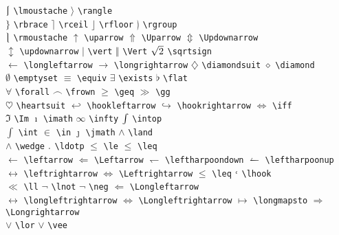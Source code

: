 \documentclass{asl}
\begin{document}
\begin{tabbing}
$\lmoustache$ \> \verb+\lmoustache+ \> $\rangle$ \> \verb+\rangle+ \\
$\rbrace$ \> \verb+\rbrace+ \> $\rceil$ \> \verb+\rceil+ \>
$\rfloor$ \> \verb+\rfloor+ \> $\rgroup$ \> \verb+\rgroup+ \\
$\rmoustache$ \> \verb+\rmoustache+ \> $\uparrow$ \> \verb+\uparrow+ \>
$\Uparrow$ \> \verb+\Uparrow+ \> $\Updownarrow$ \> \verb+\Updownarrow+ \\
$\updownarrow$ \> \verb+\updownarrow+ \> $\vert$ \> \verb+\vert+ \>
$\Vert$ \> \verb+\Vert+ \> $\sqrtsign{2}$ \> \verb+\sqrtsign+ \\
$\longleftarrow$ \> \verb+\longleftarrow+ \> $\longrightarrow$ \> \verb+\longrightarrow+ \>
$\diamondsuit$ \> \verb+\diamondsuit+
\> $\diamond$ \> \verb+\diamond+ \\
$\emptyset$ \> \verb+\emptyset+ \> $\equiv$ \> \verb+\equiv+ \>
$\exists$ \> \verb+\exists+ \> $\flat$ \> \verb+\flat+ \\
$\forall$ \> \verb+\forall+ \> $\frown$ \> \verb+\frown+ \>
$\geq$ \> \verb+\geq+  \> $\gg$ \> \verb+\gg+ \\
$\heartsuit$ \> \verb+\heartsuit+ \> $\hookleftarrow$ \> \verb+\hookleftarrow+ \>
$\hookrightarrow$ \> \verb+\hookrightarrow+ \> $\iff$ \> \verb+\iff+ \\
$\Im$ \> \verb+\Im+ \> $\imath$ \> \verb+\imath+ \>
$\infty$ \> \verb+\infty+ \> $\intop$ \> \verb+\intop+ \\
$\int$ \> \verb+\int+ \> $\in$ \> \verb+\in+ \>
$\jmath$ \> \verb+\jmath+ \> $\land$ \> \verb+\land+ \\
$\wedge$ \> \verb+\wedge+ \> $\ldotp$ \> \verb+\ldotp+ \>
$\le$ \> \verb+\le+ \> $\leq$ \> \verb+\leq+ \\
$\leftarrow$ \> \verb+\leftarrow+ \> $\Leftarrow$ \> \verb+\Leftarrow+ \>
$\leftharpoondown$ \> \verb+\leftharpoondown+ \> $\leftharpoonup$ \> \verb+\leftharpoonup+ \\
$\leftrightarrow$ \> \verb+\leftrightarrow+ \> $\Leftrightarrow$ \> \verb+\Leftrightarrow+ \>
$\leq$ \> \verb+\leq+ \> $\lhook$ \> \verb+\lhook+ \\
$\ll$ \> \verb+\ll+ \> $\lnot$ \> \verb+\lnot+ \>
$\neg$ \> \verb+\neg+ \> $\Longleftarrow$ \> \verb+\Longleftarrow+ \\
$\longleftrightarrow$ \> \verb+\longleftrightarrow+ \> $\Longleftrightarrow$ \> \verb+\Longleftrightarrow+ \>
$\longmapsto$ \> \verb+\longmapsto+ \> $\Longrightarrow$ \> \verb+\Longrightarrow+ \\
$\lor$ \> \verb+\lor+ \> $\vee$ \> \verb+\vee+ \>

\end{tabbing}
\end{document}
